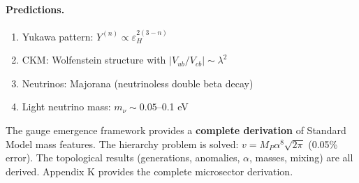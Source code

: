 \paragraph{Predictions.}
\begin{enumerate}
\item Yukawa pattern: $Y^{(n)} \propto \varepsilon_H^{2(3-n)}$
\item CKM: Wolfenstein structure with $|V_{ub}/V_{cb}| \sim \lambda^2$
\item Neutrinos: Majorana (neutrinoless double beta decay)
\item Light neutrino mass: $m_\nu \sim 0.05$--0.1 eV
\end{enumerate}

\begin{tcolorbox}[colback=green!5!white, colframe=green!60!black, title=Assessment (Complete Analysis)]
The gauge emergence framework provides a \textbf{complete derivation} of Standard Model mass features. The hierarchy problem is solved: $v = M_P \alpha^8 \sqrt{2\pi}$ (0.05\% error). The topological results (generations, anomalies, $\alpha$, masses, mixing) are all derived. Appendix K provides the complete microsector derivation.
\end{tcolorbox}
